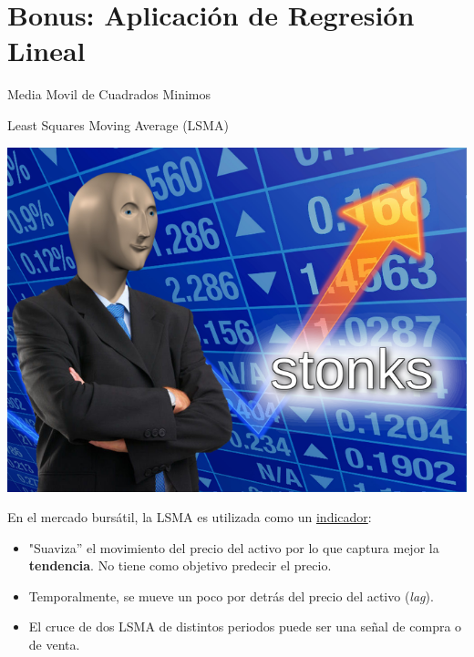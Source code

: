 \documentclass[aspectratio=169, usenames,dvipsnames]{beamer}
\begin{document}
\section{Bonus: Aplicación de Regresión Lineal}

\begin{frame}
    \centering
    \Large
    Media Movil de Cuadrados Minimos
    
    \normalsize
    Least Squares Moving Average (LSMA)

    \pause
    \includegraphics[scale=0.4]{img/meme_05.jpg}
\end{frame}

\begin{frame}
    
        En el mercado bursátil, la LSMA es utilizada como un \underline{indicador}:
        
        \begin{itemize}
            \item "Suaviza'' el movimiento del precio del activo por lo que captura mejor la \textbf{tendencia}. \alert{No tiene como objetivo predecir el precio.}
            \item Temporalmente, se mueve un poco por detrás del precio del activo (\textit{lag}).
            \item El cruce de dos LSMA de distintos periodos puede ser una señal de compra o de venta.
        \end{itemize}
\end{frame}
\end{document}
